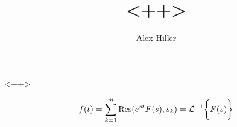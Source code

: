 \documentclass[a4paper]{article}
\author{Alex Hiller}
\title{<++>}
\begin{document}
\large 

<++>

\begin{equation}
  f(t) = \sum^{m}_{k=1} \text{Res(} e^{st}F(s), s_k) = \mathcal{L}^{-1} \bigg\{ F(s) \bigg\}
\end{equation}
\end{document}
